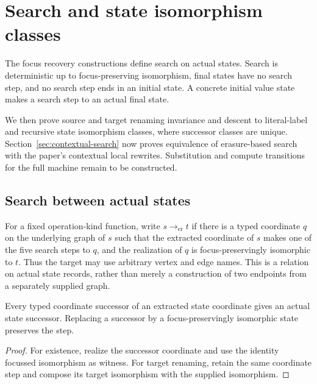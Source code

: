 \section{Search and state isomorphism classes}
\label{sec:state-search}

The focus recovery constructions define search on actual states. Search is
deterministic up to focus-preserving isomorphism, final states have no search
step, and no search step ends in an initial state. A concrete initial value
state makes a search step to an actual final state.

We then prove source and target renaming invariance and descent to literal-label
and recursive state isomorphism classes, where successor classes are unique.
Section~\ref{sec:contextual-search} now proves equivalence of erasure-based
search with the paper's contextual local rewrites. Substitution and compute
transitions for the full machine remain to be constructed.

\subsection{Search between actual states}
\begin{definition}\label{term:state-search}
For a fixed operation-kind function, write $s\to_{\mathrm{er}}t$ if there is a
typed coordinate $q$ on the underlying graph of $s$ such that the extracted
coordinate of $s$ makes one of the five search steps to $q$, and the realization
of $q$ is focus-preservingly isomorphic to $t$. Thus the target may use arbitrary
vertex and edge names. This is a relation on actual state records, rather than
merely a construction of two endpoints from a separately supplied graph.
\end{definition}

\begin{lemma}
Every typed coordinate successor of an extracted state coordinate gives an
actual state successor. Replacing a successor by a focus-preservingly
isomorphic state preserves the step.
\end{lemma}
\begin{proof}
For existence, realize the successor coordinate and use the identity focussed
isomorphism as witness. For target renaming, retain the same coordinate step
and compose its target isomorphism with the supplied isomorphism.
\end{proof}

